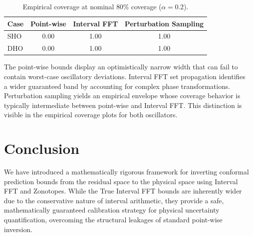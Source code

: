 \documentclass{article}
\begin{document}
\begin{table}[h]
    \centering
    \caption{Empirical coverage at nominal $80\%$ coverage ($\alpha=0.2$).}
    \label{tab:coverage-80}
    \begin{tabular}{lccc}
        \toprule
        Case & Point-wise & Interval FFT & Perturbation Sampling \\
        \midrule
        SHO & 0.00 & 1.00 & 1.00 \\
        DHO & 0.00 & 1.00 & 1.00 \\
        \bottomrule
    \end{tabular}
\end{table}

The point-wise bounds display an optimistically narrow width that can fail to contain worst-case oscillatory deviations. Interval FFT set propagation identifies a wider guaranteed band by accounting for complex phase transformations. Perturbation sampling yields an empirical envelope whose coverage behavior is typically intermediate between point-wise and Interval FFT. This distinction is visible in the empirical coverage plots for both oscillators.

\section{Conclusion}
We have introduced a mathematically rigorous framework for inverting conformal prediction bounds from the residual space to the physical space using Interval FFT and Zonotopes. While the True Interval FFT bounds are inherently wider due to the conservative nature of interval arithmetic, they provide a safe, mathematically guaranteed calibration strategy for physical uncertainty quantification, overcoming the structural leakages of standard point-wise inversion.
\end{document}
